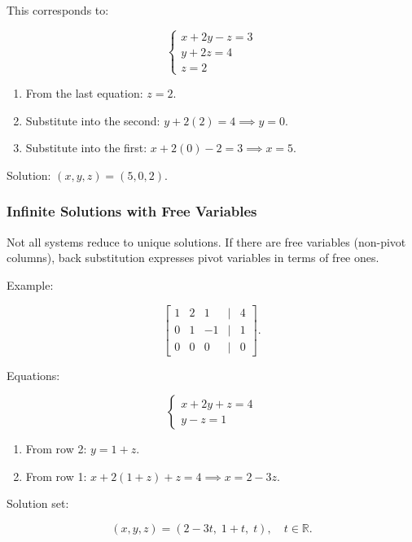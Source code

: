 \documentclass[
  letterpaper,
  DIV=11,
  numbers=noendperiod]{scrreprt}
\providecommand{\tightlist}{%
  \setlength{\itemsep}{0pt}\setlength{\parskip}{0pt}}
\begin{document}
This corresponds to:

\[
\begin{cases}  
x + 2y - z = 3 \\  
y + 2z = 4 \\  
z = 2  
\end{cases}
\]

\begin{enumerate}
\def\labelenumi{\arabic{enumi}.}
\tightlist
\item
  From the last equation: \(z = 2\).
\item
  Substitute into the second: \(y + 2(2) = 4 \implies y = 0\).
\item
  Substitute into the first: \(x + 2(0) - 2 = 3 \implies x = 5\).
\end{enumerate}

Solution: \((x, y, z) = (5, 0, 2)\).

\subsubsection{Infinite Solutions with Free
Variables}\label{infinite-solutions-with-free-variables}

Not all systems reduce to unique solutions. If there are free variables
(non-pivot columns), back substitution expresses pivot variables in
terms of free ones.

Example:

\[
\begin{bmatrix}  
1 & 2 & 1 & | & 4 \\  
0 & 1 & -1 & | & 1 \\  
0 & 0 & 0 & | & 0  
\end{bmatrix}.
\]

Equations:

\[
\begin{cases}  
x + 2y + z = 4 \\  
y - z = 1  
\end{cases}
\]

\begin{enumerate}
\def\labelenumi{\arabic{enumi}.}
\tightlist
\item
  From row 2: \(y = 1 + z\).
\item
  From row 1: \(x + 2(1 + z) + z = 4 \implies x = 2 - 3z\).
\end{enumerate}

Solution set:

\[
(x, y, z) = (2 - 3t, \; 1 + t, \; t), \quad t \in \mathbb{R}.
\]
\end{document}
